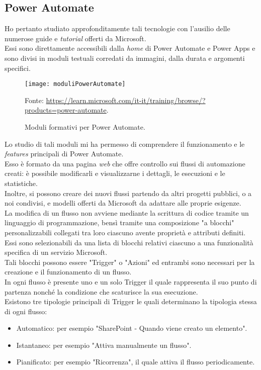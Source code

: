 \subsection{Power Automate}
Ho pertanto studiato approfonditamente tali tecnologie con l'ausilio delle numerose guide e \emph{tutorial} offerti da Microsoft.\\
Essi sono direttamente accessibili dalla \emph{home} di Power Automate e Power Apps e sono divisi in moduli testuali corredati da immagini, dalla durata e argomenti specifici. 

\begin{figure}[htbp] 
    \centering 
    \texttt{[image: moduliPowerAutomate]} 
    \caption{Moduli formativi per Power Automate.}
    \label{fig:moduliPowerAutomate}
    \vspace{1mm}
    Fonte: \url{https://learn.microsoft.com/it-it/training/browse/?products=power-automate}.
\end{figure}

\noindent Lo studio di tali moduli mi ha permesso di comprendere il funzionamento e le \emph{features} principali di Power Automate.\\
Esso è formato da una pagina \emph{web} che offre controllo sui flussi di automazione creati: è possibile modificarli e visualizzarne i dettagli, le esecuzioni e le statistiche.\\
Inoltre, si possono creare dei nuovi flussi partendo da altri progetti pubblici, o a noi condivisi, e modelli offerti da Microsoft da adattare alle proprie esigenze.\\
La modifica di un flusso non avviene mediante la scrittura di codice tramite un linguaggio di programmazione, bensì tramite una composizione "a blocchi" personalizzabili collegati tra loro ciascuno avente proprietà e attributi definiti.\\
Essi sono selezionabili da una lista di blocchi relativi ciascuno a una funzionalità specifica di un servizio Microsoft.\\
Tali blocchi possono essere "Trigger" o "Azioni" ed entrambi sono necessari per la creazione e il funzionamento di un flusso.\\
In ogni flusso è presente uno e un solo Trigger il quale rappresenta il suo punto di partenza nonché la condizione che scaturisce la sua esecuzione.\\
Esistono tre tipologie principali di Trigger le quali determinano la tipologia stessa di ogni flusso:
\begin{itemize}
    \item Automatico: per esempio "SharePoint - Quando viene creato un elemento". 
    \item Istantaneo: per esempio "Attiva manualmente un flusso".
    \item Pianificato: per esempio "Ricorrenza", il quale attiva il flusso periodicamente.\\
\end{itemize}

